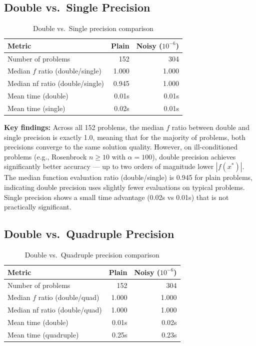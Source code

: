 \documentclass[11pt,a4paper]{article}
\begin{document}
\subsection{Double vs.\ Single Precision}

\begin{table}[H]
\centering
\caption{Double vs.\ Single precision comparison}
\label{tab:ds}
\begin{tabular}{l r r}
\toprule
\textbf{Metric} & \textbf{Plain} & \textbf{Noisy ($10^{-6}$)} \\
\midrule
Number of problems               & 152   & 304 \\
Median $f$ ratio (double/single) & 1.000 & 1.000 \\
Median nf ratio (double/single)  & 0.945 & 1.000 \\
Mean time (double)               & 0.01s & 0.01s \\
Mean time (single)               & 0.02s & 0.01s \\
\bottomrule
\end{tabular}
\end{table}

\textbf{Key findings:} Across all 152 problems, the median $f$ ratio between
double and single precision is exactly 1.0, meaning that for the majority of
problems, both precisions converge to the same solution quality. However, on
ill-conditioned problems (e.g., Rosenbrock $n \ge 10$ with $\alpha=100$), double
precision achieves significantly better accuracy --- up to two orders of magnitude
lower $|f(x^*)|$. The median function evaluation ratio (double/single) is 0.945 for
plain problems, indicating double precision uses slightly fewer evaluations on
typical problems. Single precision shows a small time advantage (0.02s vs 0.01s)
that is not practically significant.

\subsection{Double vs.\ Quadruple Precision}

\begin{table}[H]
\centering
\caption{Double vs.\ Quadruple precision comparison}
\label{tab:dq}
\begin{tabular}{l r r}
\toprule
\textbf{Metric} & \textbf{Plain} & \textbf{Noisy ($10^{-6}$)} \\
\midrule
Number of problems               & 152   & 304 \\
Median $f$ ratio (double/quad)   & 1.000 & 1.000 \\
Median nf ratio (double/quad)    & 1.000 & 1.000 \\
Mean time (double)               & 0.01s & 0.02s \\
Mean time (quadruple)            & 0.25s & 0.23s \\
\bottomrule
\end{tabular}
\end{table}
\end{document}

